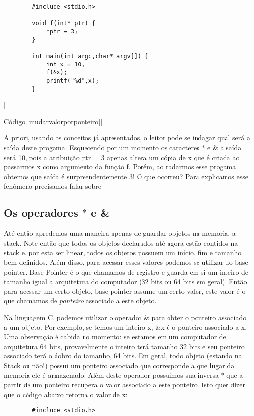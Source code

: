 \documentclass{amsbook}
\begin{document}
{{{{{	\begin{lstlisting}
		#include <stdio.h>

		void f(int* ptr) {
			*ptr = 3;
		}

		int main(int argc,char* argv[]) {
			int x = 10;
			f(&x);
			printf("%d",x);
		}
	\end{lstlisting}[{\label{mudarvalorporponteiro}Código \ref{mudarvalorporponteiro}]

	A priori, usando os conceitos já apresentados, o leitor pode se indagar qual será a saída deste progama. Esquecendo por um momento os caracteres $\ast$ e \& a saída será 10, pois a atribuição ptr = 3 apenas altera um cópia de x que é criada ao passarmos x como argumento da função f. Porém, ao rodarmos esse progama obtemos que saída é surpreendentemente 3! O que ocorreu? Para explicamos esse fenômeno precisamos falar sobre

	\subsection{Os operadores $\ast$ e \&}

	Até então apredemos uma maneira apenas de guardar objetos na memoria, a stack. Note então que todos os objetos declarados até agora estão contidos na stack e, por esta ser linear, todos os objetos possuem um início, fim e tamanho bem definidos. Além disso, para acessar esses valores podemos se utilizar do base pointer. Base Pointer é o que chamamos de registro e guarda em si um inteiro de tamanho igual a arquitetura do computador (32 bits ou 64 bits em geral). Então para acessar um certo objeto, base pointer assume um certo valor, este valor é o que chamamos de \textit{ponteiro} associado a este objeto. 

	Na linguagem C, podemos utilizar o operador \& para obter o ponteiro associado a um objeto. Por exemplo, se temos um inteiro x, \&x é o ponteiro associado a x. Uma observação é cabida no momento: se estamos em um computador de arquitetura 64 bits, provavelmente o inteiro terá tamanho 32 bits e seu ponteiro associado terá o dobro do tamanho, 64 bits. Em geral, todo objeto (estando na Stack ou não!) possui um ponteiro associado que corresponde a que lugar da memoria ele é armazenado. Além deste operador possuimos sua inversa $\ast$ que a partir de um ponteiro recupera o valor associado a este ponteiro. Isto quer dizer que o código abaixo retorna o valor de x:

	\begin{lstlisting}
		#include <stdio.h>


\end{lstlisting}}}}}}}
\end{document}

